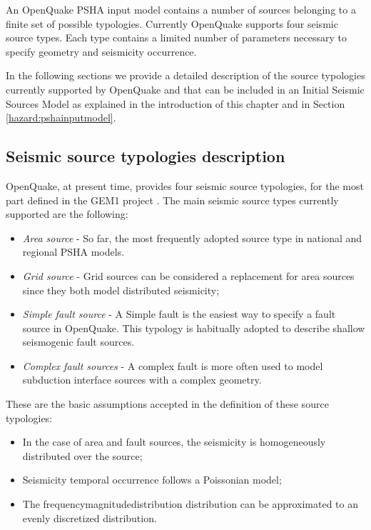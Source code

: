 An OpenQuake PSHA input model contains a number of sources belonging 
to a finite set of possible typologies. Currently OpenQuake supports 
four seismic source types. Each type contains a limited number of 
parameters necessary to specify geometry and seismicity occurrence. 

In the following sections we provide a detailed description of the 
source typologies currently supported by OpenQuake and that can be 
included in an Initial Seismic Sources Model as explained in the 
introduction of this chapter and in Section \ref{hazard:pshainputmodel}.
%
\subsection{Seismic source typologies description}
%
OpenQuake, at present time, provides four seismic source typologies, 
for the most part defined in the GEM1 project \citep{pagani2010}. 
%
The main seismic source types currently supported are the following:
\begin{itemize}
\item \emph{Area source} - So far, the most frequently adopted source 
type in national and regional PSHA models.
\item \emph{Grid source} - Grid sources can be considered a replacement 
for area sources since they both model distributed seismicity;
\item \emph{Simple fault source} - A Simple fault is the easiest way to
specify a fault source in OpenQuake. This typology is habitually adopted 
to describe shallow seismogenic fault sources.
\item \emph{Complex fault sources} - A complex fault is more often used 
to model subduction interface sources with a complex geometry. 
\end{itemize}

These are the basic assumptions accepted in the definition of these source 
typologies:
\begin{itemize}
\item In the case of area and fault sources, the seismicity is homogeneously 
distributed over the source; 
\item Seismicity temporal occurrence follows a Poissonian model; 
\item The \gls{frequencymagnitudedistribution} distribution can be approximated to an evenly 
discretized distribution. 
\end{itemize}
%
